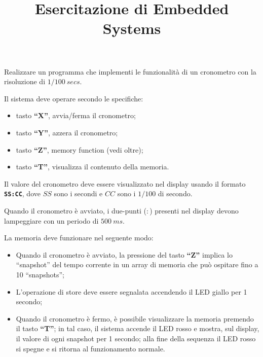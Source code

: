 \documentclass[a4paper,12pt]{article}
\title{Esercitazione di Embedded Systems}
\begin{document}
\maketitle
\def\X{\textbf{``X''}}
\def\Y{\textbf{``Y''}}
\def\Z{\textbf{``Z''}}
\def\T{\textbf{``T''}}


Realizzare un programma che implementi le funzionalit\`a di un
cronometro con la risoluzione di $1/100~secs$.

Il sistema deve operare secondo le specifiche:

\begin{itemize}
\item tasto \X{}, avvia/ferma il cronometro;
\item tasto \Y{}, azzera il cronometro;
\item tasto \Z{}, memory function (vedi oltre);
\item tasto \T{}, visualizza il contenuto della memoria.
\end{itemize}

Il valore del cronometro deve essere visualizzato nel display usando
il formato \textbf{\texttt{SS:CC}}, dove $SS$ sono i secondi e $CC$
sono i $1/100$ di secondo.

Quando il cronometro \`e avviato, i due-punti ($:$) presenti nel
display devono lampeggiare con un periodo di $500~ms$.

\vspace{1em}

La memoria deve funzionare nel seguente modo:
\begin{itemize}
\item Quando il cronometro \`e avviato, la pressione del tasto \Z{}
  implica lo ``snapshot'' del tempo corrente in un array di memoria
  che pu\`o ospitare fino a 10 ``snapshots'';
\item L'operazione di store deve essere segnalata accendendo il LED
  giallo per 1 secondo;
\item Quando il cronometro \`e fermo, \`e possibile visualizzare la
  memoria premendo il tasto \T{}; in tal caso, il sistema accende il
  LED rosso e mostra, sul display, il valore di ogni snapshot per 1
  secondo; alla fine della sequenza il LED rosso si spegne e si
  ritorna al funzionamento normale.
\end{itemize}

\end{document}
